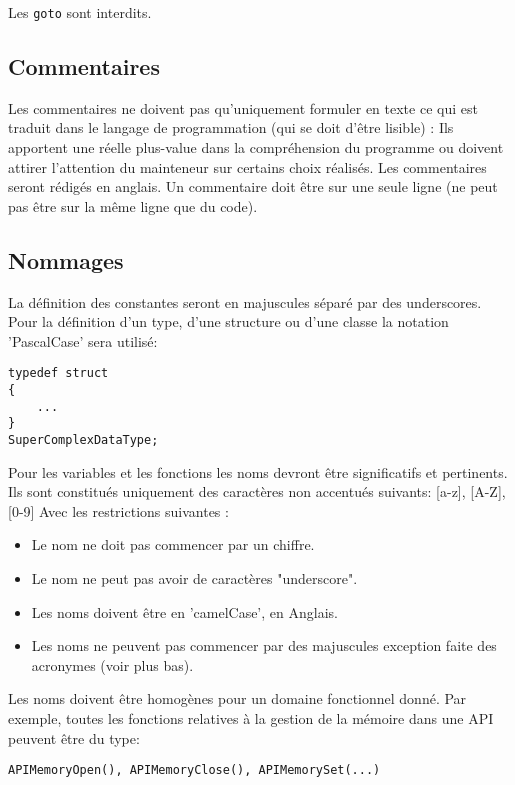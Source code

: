 Les \texttt{goto} sont interdits.

\subsection{Commentaires}
Les commentaires ne doivent pas qu’uniquement formuler en texte ce qui est traduit
dans le langage de programmation (qui se doit d'être lisible) : \newline
Ils apportent une réelle plus-value dans la compréhension du programme ou doivent
attirer l’attention du mainteneur sur certains choix réalisés. Les commentaires seront 
rédigés en anglais. \newline
Un commentaire doit être sur une seule ligne (ne peut pas être sur la même ligne 
que du code).
 
\subsection{Nommages}
La définition des constantes seront en majuscules séparé par des underscores.\newline
Pour la définition d'un type, d'une structure ou d'une classe la notation 'PascalCase'
sera utilisé: 
\begin{verbatim}
typedef struct 
{
    ...
}
SuperComplexDataType;
\end{verbatim}

Pour les variables et les fonctions les noms devront être significatifs et 
pertinents.\newline
Ils sont constitués uniquement des caractères non accentués suivants: 
[a-z], [A-Z], [0-9]\newline
Avec les restrictions suivantes :
\begin{itemize}
	\item Le nom ne doit pas commencer par un chiffre.
	\item Le nom ne peut pas avoir de caractères "underscore".
	\item Les noms doivent être en 'camelCase', en Anglais.
	\item Les noms ne peuvent pas commencer par des majuscules exception faite
          des acronymes (voir plus bas).
\end{itemize}
Les noms doivent être homogènes pour un domaine fonctionnel donné. Par exemple, 
toutes les fonctions relatives à la gestion de la mémoire dans une API peuvent 
être du type: \newline 
\begin{verbatim}
APIMemoryOpen(), APIMemoryClose(), APIMemorySet(...)
\end{verbatim}

